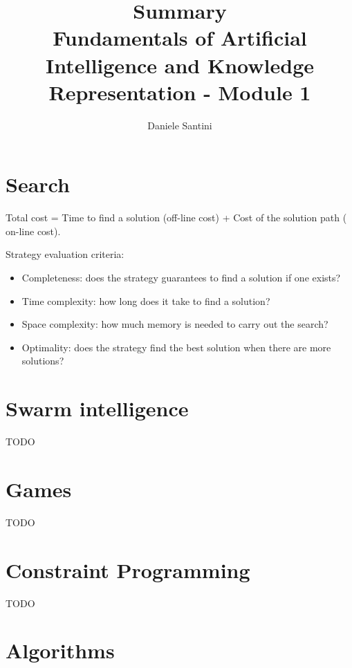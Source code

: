 \documentclass[]{article}
\title{Summary \\ \large Fundamentals of Artificial Intelligence and Knowledge Representation - Module 1}
\author{Daniele Santini}
\begin{document}

\section{Search}

Total cost = Time to find a solution (off-line cost) + Cost of the solution path (
on-line cost).

Strategy evaluation criteria:
\begin{itemize}
	\item Completeness: does the strategy guarantees to find a solution if one exists?
	\item Time complexity: how long does it take to find a solution?
	\item Space complexity: how much memory is needed to carry out the search?
	\item Optimality: does the strategy find the best solution when there are more solutions?
\end{itemize}

\section{Swarm intelligence}

TODO

\section{Games}

TODO

\section{Constraint Programming}

TODO

\section{Algorithms}
\end{document}
